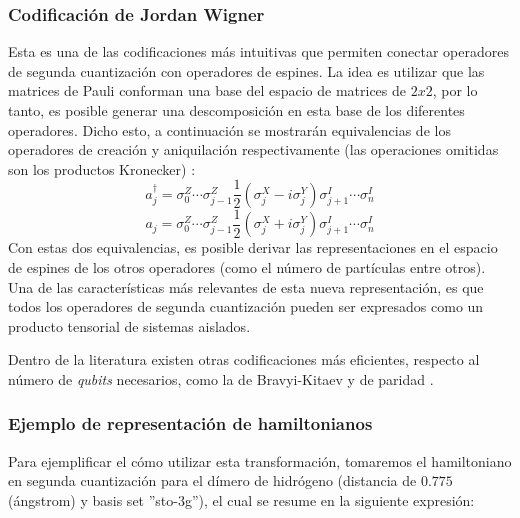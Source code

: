 \subsubsection{Codificación de Jordan Wigner}
Esta es una de las codificaciones más intuitivas que permiten conectar operadores de segunda cuantización con operadores de espines. La idea es utilizar que las matrices de Pauli conforman una base del espacio de matrices de $2x2$, por lo tanto, es posible generar una descomposición en esta base de los diferentes operadores. Dicho esto, a continuación se mostrarán equivalencias de los operadores de creación y aniquilación respectivamente (las operaciones omitidas son los productos Kronecker) \cite{Lana}:
\begin{equation*}
    a_j^{\dag} = \sigma_0^Z \cdots \sigma^Z_{j-1} \frac{1}{2}(\sigma^X_j -i\sigma^Y_j) \sigma^I_{j+1} \cdots \sigma^I_{n} 
\end{equation*}
\begin{equation*}
    a_j = \sigma^Z_0 \cdots \sigma^Z_{j-1}  \frac{1}{2}(\sigma^X_j +i\sigma^Y_j) \sigma^I_{j+1} \cdots \sigma^I_{n}
\end{equation*}
Con estas dos equivalencias, es posible derivar las representaciones en el espacio de espines de los otros operadores (como el número de partículas entre otros). Una de las características más relevantes de esta nueva representación, es que todos los operadores de segunda cuantización pueden ser expresados como un producto tensorial de sistemas aislados. 

Dentro de la literatura existen otras codificaciones más eficientes, respecto al número de \textit{qubits} necesarios, como la de Bravyi-Kitaev y de paridad \cite{JW-BK-COD}.

\subsubsection{Ejemplo de representación de hamiltonianos}

Para ejemplificar el cómo utilizar esta transformación, tomaremos el hamiltoniano en segunda cuantización para el dímero de hidrógeno (distancia de $0.775$ (ángstrom) y basis set ''sto-3g''), el cual se resume en la siguiente expresión:

